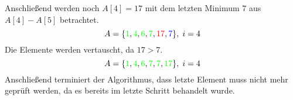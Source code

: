 \noindent
Anschließend werden noch $A[4] = 17$ mit dem letzten Minimum $7$ aus $A[4] - A[5]$ betrachtet.
\begin{equation}
	A = \{\textcolor{green}{1}, \textcolor{green}{4}, \textcolor{green}{6},\textcolor{green}{7}, \textcolor{red}{17}, \textcolor{blue}{7}\},\;i = 4 \\
\end{equation}
\noindent
Die Elemente werden vertauscht, da $17 > 7$.
\begin{equation}
	A = \{\textcolor{green}{1}, \textcolor{green}{4}, \textcolor{green}{6},\textcolor{green}{7}, \textcolor{green}{7}, \textcolor{green}{17}\},\;i = 4 \\
\end{equation}
\noindent
Anschließend terminiert der Algorithmus, dass letzte Element muss nicht mehr geprüft werden, da es bereits im letzte Schritt behandelt wurde. 

\newpage



